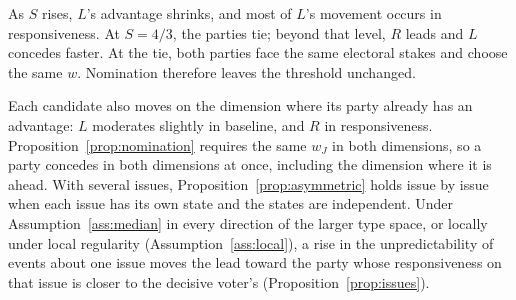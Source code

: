 \documentclass[12pt,letterpaper]{article}
\begin{document}
As $S$ rises, $L$'s advantage shrinks, and most of $L$'s movement occurs in responsiveness. At $S=4/3$, the parties tie; beyond that level, $R$ leads and $L$ concedes faster. At the tie, both parties face the same electoral stakes and choose the same $w$. Nomination therefore leaves the threshold unchanged.

Each candidate also moves on the dimension where its party already has an advantage: $L$ moderates slightly in baseline, and $R$ in responsiveness. Proposition~\ref{prop:nomination} requires the same $w_J$ in both dimensions, so a party concedes in both dimensions at once, including the dimension where it is ahead. With several issues, Proposition~\ref{prop:asymmetric} holds issue by issue when each issue has its own state and the states are independent. Under Assumption~\ref{ass:median} in every direction of the larger type space, or locally under local regularity (Assumption~\ref{ass:local}), a rise in the unpredictability of events about one issue moves the lead toward the party whose responsiveness on that issue is closer to the decisive voter's (Proposition~\ref{prop:issues}).
\end{document}
